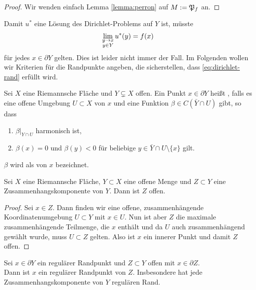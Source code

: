 \begin{proof}
  Wir wenden einfach Lemma \ref{lemma:perron} auf $M := \mathfrak{P}_f$ an.
\end{proof}

\begin{rem}
  Damit $u^\ast$ eine Lösung des Dirichlet-Problems auf $Y$ ist,
  müsste
  \begin{align}
  \lim_{\substack{y\rightarrow x\\y \in Y}}u^\ast(y) =
  f(x) \label{eq:dirichlet-rand} 
  \end{align}
  für jedes $x \in \partial Y$ gelten. Dies ist leider nicht immer der
  Fall. Im Folgenden wollen wir Kriterien für die Randpunkte angeben,
  die sicherstellen, dass \eqref{eq:dirichlet-rand} erfüllt wird.
\end{rem}

\begin{defin}
  Sei $X$ eine Riemannsche Fläche und  $Y \subsetneq X$ offen. Ein
  Punkt $x \in \partial Y$ heißt , falls es eine
  offene Umgebung $U \subset X$ von $x$ und eine Funktion $\beta  \in
  C(\bar Y \cap U)$ gibt, so dass
  \begin{enumerate}
  \item $\beta|_{Y \cap U}$ harmonisch ist,
  \item $\beta(x) =0$ und $\beta(y) < 0$ für beliebige $y \in \bar Y
    \cap U \setminus \{x\}$ gilt.
  \end{enumerate}
  $\beta$ wird als  von $x$ bezeichnet.
\end{defin}

\begin{lemma}
  \label{lemma:zsh-komp}
  Sei $X$ eine Riemannsche Fläche, $Y \subset X$ eine offene Menge und
  $Z \subset Y$ eine Zusammenhangskomponente von $Y$. Dann ist $Z$ offen.
\end{lemma}

\begin{proof}
  Sei $x \in Z$. Dann finden wir eine offene, zusammenhängende
  Koordinatenumgebung $U \subset Y$ mit $x \in U$. Nun ist aber
  $Z$ die maximale zusammenhängende Teilmenge, die $x$ enthält und da
  $U$ auch zusammenhängend gewählt wurde, muss $U \subset Z$
  gelten. Also ist $x$ ein innerer Punkt und damit $Z$ offen.
\end{proof}

\begin{cor}
  Sei $x \in \partial Y$ ein regulärer Randpunkt und $Z \subset Y$
  offen mit $x \in \partial Z$.\\
  Dann ist $x$ ein regulärer Randpunkt von $Z$. Insbesondere hat jede
  Zusammenhangskomponente von $Y$ regulären Rand.
\end{cor}

